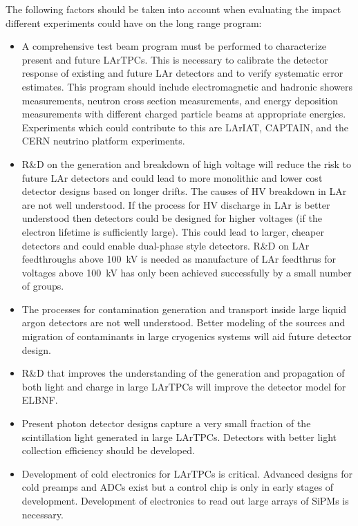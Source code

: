The following factors should be taken into account when evaluating the impact different experiments 
could have on the long range program:
\begin{itemize}

\item A comprehensive test beam program must be performed to characterize present and future 
LArTPCs. This is necessary to calibrate the detector response of existing and future LAr detectors and to 
verify systematic error estimates. This program should include electromagnetic and hadronic 
showers measurements, neutron cross section measurements, and energy deposition measurements 
with different charged particle beams at appropriate energies. Experiments 
which could contribute to this are LArIAT, CAPTAIN, and the CERN neutrino platform experiments.

\item R\&D on the generation and breakdown of high voltage will reduce the risk to future LAr detectors 
and could lead to more monolithic and lower cost detector designs based on longer drifts. The causes of 
HV breakdown in LAr are not well understood. If the process for HV discharge in LAr is better understood 
then detectors could be designed for higher voltages (if the electron lifetime is sufficiently large). This 
could lead to larger, cheaper detectors and could enable dual-phase style detectors. R\&D on LAr 
feedthroughs above 100~kV is needed as manufacture of LAr feedthrus for voltages above 100~kV has only been achieved successfully by a 
small number of groups.

\item The processes for contamination generation and transport inside large liquid argon detectors are 
not well understood. Better modeling of the sources and migration of contaminants in large cryogenics 
systems will aid future detector design.

\item R\&D that improves the understanding of the generation and propagation of both light and 
charge in large LArTPCs will improve the detector model for ELBNF.
 
\item Present photon detector designs capture a very small fraction of the scintillation light generated in 
large LArTPCs. Detectors with better light collection efficiency should be developed.

\item Development of cold electronics for LArTPCs is critical. Advanced designs for cold 
preamps and ADCs exist but a control chip is only in early stages of development. Development of 
electronics to read out large arrays of SiPMs is necessary.

\end{itemize}




